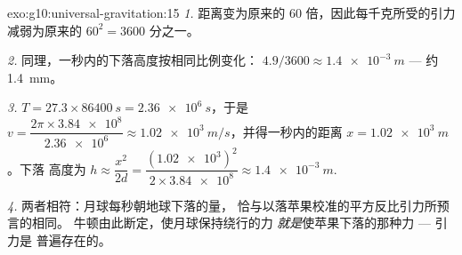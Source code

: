 \begin{solution}{exo:g10:universal-gravitation:15}
\emph{1.} 距离变为原来的 $60$ 倍，因此每千克所受的引力
减弱为原来的 $60^2 = 3600$ 分之一。

\emph{2.} 同理，一秒内的下落高度按相同比例变化：
$4.9/3600 \approx \qty{1.4e-3}{m}$ --- 约 \qty{1.4}{mm}。

\emph{3.} $T = 27.3 \times \qty{86400}{s} = \qty{2.36e6}{s}$，于是
$v = \dfrac{2\pi \times \num{3.84e8}}{\num{2.36e6}} \approx
\qty{1.02e3}{m/s}$，并得一秒内的距离 $x = \qty{1.02e3}{m}$。下落
高度为 $h \approx \dfrac{x^2}{2d}
= \dfrac{(\num{1.02e3})^2}{2 \times \num{3.84e8}}
\approx \qty{1.4e-3}{m}$.

\emph{4.} 两者相符：月球每秒朝地球下落的量，
恰与以落苹果校准的平方反比引力所预言的相同。
牛顿由此断定，使月球保持绕行的力
\emph{就是}使苹果下落的那种力 --- 引力是
普遍存在的。
\end{solution}

